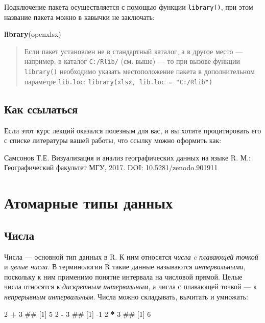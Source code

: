 \documentclass[]{book}
\newenvironment{Shaded}{\begin{snugshade}}{\end{snugshade}}
\newcommand{\KeywordTok}[1]{\textcolor[rgb]{0.13,0.29,0.53}{\textbf{#1}}}
\newcommand{\DecValTok}[1]{\textcolor[rgb]{0.00,0.00,0.81}{#1}}
\newcommand{\StringTok}[1]{\textcolor[rgb]{0.31,0.60,0.02}{#1}}
\newcommand{\OperatorTok}[1]{\textcolor[rgb]{0.81,0.36,0.00}{\textbf{#1}}}
\newcommand{\NormalTok}[1]{#1}
\begin{document}
Подключение пакета осуществляется с помощью функции \texttt{library()},
при этом название пакета можно в кавычки не заключать:

\begin{Shaded}
\begin{Highlighting}[]
\KeywordTok{library}\NormalTok{(openxlsx)}
\end{Highlighting}
\end{Shaded}

\begin{quote}
Если пакет установлен не в стандартный каталог, а в другое место ---
например, в каталог \texttt{С:/Rlib/} (см. выше) --- то при вызове
функции \texttt{library()} необходимо указать местоположение пакета в
дополнительном параметре \texttt{lib.loc}:
\texttt{library(xlsx,\ lib.loc\ =\ "C:/Rlib")}
\end{quote}

\section*{Как ссылаться}\label{-}

Если этот курс лекций оказался полезным для вас, и вы хотите
процитировать его с списке литературы вашей работы, что ссылку можно
оформить как:

Самсонов Т.Е. Визуализация и анализ географических данных на языке R.
М.: Географический факультет МГУ, 2017. DOI: 10.5281/zenodo.901911

\chapter{Атомарные типы данных}\label{data_types}

\section{Числа}

Числа --- основной тип данных в R. К ним относятся \emph{числа c
плавающей точкой} и \emph{целые числа}. В терминологии R такие данные
называются \emph{интервальными}, поскольку к ним применимо понятие
интервала на числовой прямой. Целые числа относятся к \emph{дискретным
интервальным}, а числа с плавающей точкой --- к \emph{непрерывным
интервальным}. Числа можно складывать, вычитать и умножать:

\begin{Shaded}
\begin{Highlighting}[]
\DecValTok{2} \OperatorTok{+}\StringTok{ }\DecValTok{3}
\NormalTok{## [1] 5}
\DecValTok{2} \OperatorTok{-}\StringTok{ }\DecValTok{3}
\NormalTok{## [1] -1}
\DecValTok{2} \OperatorTok{*}\StringTok{ }\DecValTok{3}
\NormalTok{## [1] 6}
\end{Highlighting}
\end{Shaded}
\end{document}
